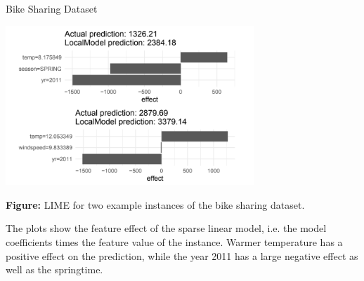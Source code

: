\documentclass[11pt,compress,t,notes=noshow, xcolor=table]{beamer}
\begin{document}
\begin{vbframe}{Bike Sharing Dataset}
\vspace{-.3cm}

\begin{center}
\includegraphics[width=0.7\textwidth]{figure/bike-figure.png}
\end{center} 

\footnotesize \textbf{Figure:} LIME for two example instances of the bike sharing dataset.

\normalsize
\vspace{0.2cm}
The plots show the feature effect of the sparse linear model, i.e. the model coefficients times the feature value of the instance.
Warmer temperature has a positive effect on the prediction, 
while the year 2011 has a large negative effect as well as the springtime.
\end{vbframe}
\end{document}
